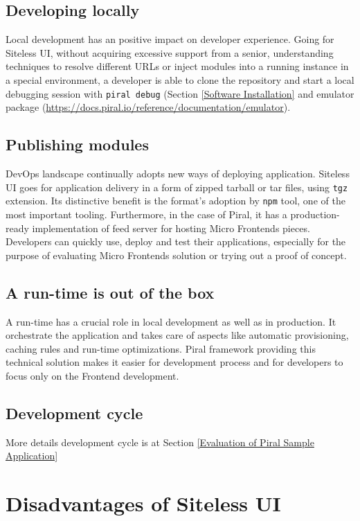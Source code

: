 \documentclass[a4paper]{book}
\begin{document}
\subsection{Developing locally}
Local development has an positive impact on developer experience. Going for Siteless UI, without acquiring excessive support from a senior, understanding techniques to resolve different URLs or inject modules into a running instance in a special environment, a developer is able to clone the repository and start a local debugging session with \verb|piral debug| (Section \ref{Software Installation} and emulator package (\url{https://docs.piral.io/reference/documentation/emulator}).

\subsection{Publishing modules}
DevOps landscape continually adopts new ways of deploying application. Siteless UI goes for application delivery in a form of zipped tarball or tar files, using \verb|tgz| extension. Its distinctive benefit is the format's adoption by \verb|npm| tool, one of the most important tooling. Furthermore, in the case of Piral, it has a production-ready implementation of feed server for hosting Micro Frontends pieces. Developers can quickly use, deploy and test their applications, especially for the purpose of evaluating Micro Frontends solution or trying out a proof of concept. \cite{Rap20}

\subsection{A run-time is out of the box}
A run-time has a crucial role in local development as well as in production. It orchestrate the application and takes care of aspects like automatic provisioning, caching rules and run-time optimizations. Piral framework providing this technical solution makes it easier for development process and for developers to focus only on the Frontend development.

\subsection{Development cycle}
More details development cycle is at Section \ref{Evaluation of Piral Sample Application}

\section{Disadvantages of Siteless UI}
\end{document}
